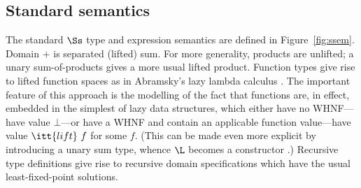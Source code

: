 \begin{article}

\subsection{Standard semantics}

The standard $\Ss$ type and expression semantics are defined in
Figure~\ref{fig:ssem}.  
Domain $\plus$ is separated (lifted) sum.  
For more generality, products are unlifted; a unary sum-of-products gives a
more usual lifted product.  
Function types give rise to lifted function
spaces as in Abramsky's lazy lambda calculus \cite{Abr89}.
The important feature of this approach is the modelling of the
fact that functions are, in effect, embedded in the simplest of
lazy data structures, which either have no WHNF---have value $\bot$---or
have a WHNF and contain an applicable function value---have value
$\itt{lift}~f$ for some $f$.  (This can be made even more explicit by
introducing a unary sum type, whence ${\it \L}$ becomes a constructor \cite{Dav94}.)
Recursive type definitions give rise to recursive domain
specifications which have the usual least-fixed-point solutions.


\end{article}
